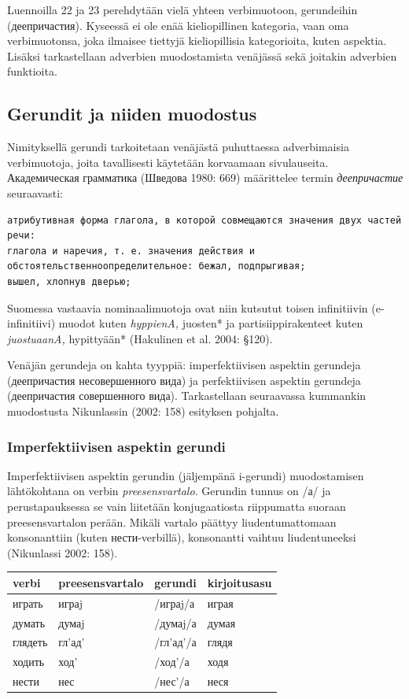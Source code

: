 \documentclass[]{scrartcl}
\begin{document}
Luennoilla 22 ja 23 perehdytään vielä yhteen verbimuotoon, gerundeihin
(деепричастия). Kyseessä ei ole enää kieliopillinen kategoria, vaan oma
verbimuotonsa, joka ilmaisee tiettyjä kieliopillisia kategorioita, kuten
aspektia. Lisäksi tarkastellaan adverbien muodostamista venäjässä sekä
joitakin adverbien funktioita.

\subsection{Gerundit ja niiden
muodostus}\label{gerundit-ja-niiden-muodostus}

Nimityksellä gerundi tarkoitetaan venäjästä puhuttaessa adverbimaisia
verbimuotoja, joita tavallisesti käytetään korvaamaan sivulauseita.
Академическая грамматика (Шведова 1980: 669) määrittelee termin
\emph{деепричастие} seuraavasti:

\begin{verbatim}
атрибутивная форма глагола, в которой совмещаются значения двух частей речи:
глагола и наречия, т. е. значения действия и
обстоятельственно­определительное: бежал, подпрыгивая;
вышел, хлопнув дверью;
\end{verbatim}

Suomessa vastaavia nominaalimuotoja ovat niin kutsutut toisen
infinitiivin (e-infinitiivi) muodot kuten \emph{hyppienA, }juosten* ja
partisiippirakenteet kuten \emph{juostuaanA, }hypittyään* (Hakulinen et
al. 2004: §120).

Venäjän gerundeja on kahta tyyppiä: imperfektiivisen aspektin gerundeja
(деепричастия несовершенного вида) ja perfektiivisen aspektin gerundeja
(деепричастия совершенного вида). Tarkastellaan seuraavassa kummankin
muodostusta Nikunlassin (2002: 158) esityksen pohjalta.

\subsubsection{Imperfektiivisen aspektin
gerundi}\label{imperfektiivisen-aspektin-gerundi}

Imperfektiivisen aspektin gerundin (jäljempänä i-gerundi) muodostamisen
lähtökohtana on verbin \emph{preesensvartalo}. Gerundin tunnus on /а/ ja
perustapauksessa se vain liitetään konjugaatiosta riippumatta suoraan
preesensvartalon perään. Mikäli vartalo päättyy liudentumattomaan
konsonanttiin (kuten нести-verbillä), konsonantti vaihtuu liudentuneeksi
(Nikunlassi 2002: 158).

\begin{longtable}[c]{@{}llll@{}}
\toprule
verbi & preesensvartalo & gerundi & kirjoitusasu\tabularnewline
\midrule
\endhead
играть & играj & /играj/а & играя\tabularnewline
думать & думаj & /думаj/а & думая\tabularnewline
глядеть & гл'ад' & /гл'ад'/а & глядя\tabularnewline
ходить & ход' & /ход'/а & ходя\tabularnewline
нести & нес & /нес'/а & неся\tabularnewline
\bottomrule
\end{longtable}
\end{document}
